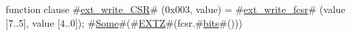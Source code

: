 function clause #\hyperref[sailRISCVzextzywritezyCSR]{ext\_write\_CSR}# (0x003, value) = { #\hyperref[sailRISCVzextzywritezyfcsr]{ext\_write\_fcsr}# (value [7..5], value [4..0]); #\hyperref[sailRISCVzSome]{Some}#(#\hyperref[sailRISCVzEXTZ]{EXTZ}#(fcsr.#\hyperref[sailRISCVzbits]{bits}#())) }
